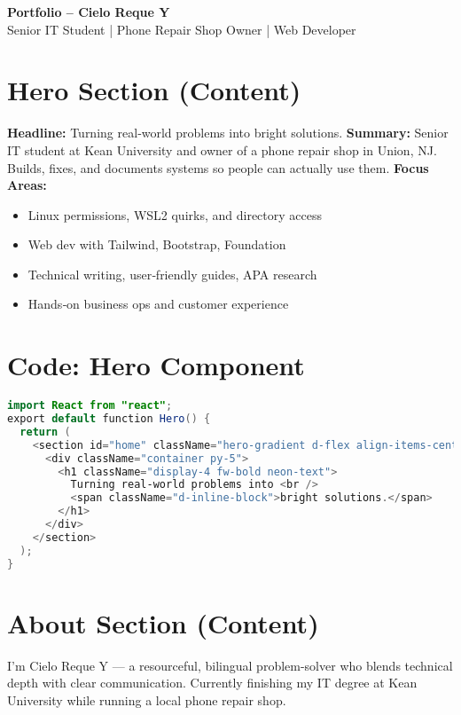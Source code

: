 \documentclass[11pt]{article}
\begin{document}
\begin{center}
    {\Huge \textbf{Portfolio – Cielo Reque Y}} \\
    \vspace{0.5em}
    Senior IT Student | Phone Repair Shop Owner | Web Developer
\end{center}

\section*{Hero Section (Content)}
\textbf{Headline:} Turning real‑world problems into bright solutions.  
\textbf{Summary:} Senior IT student at Kean University and owner of a phone repair shop in Union, NJ. Builds, fixes, and documents systems so people can actually use them.  
\textbf{Focus Areas:}
\begin{itemize}[leftmargin=*]
    \item Linux permissions, WSL2 quirks, and directory access
    \item Web dev with Tailwind, Bootstrap, Foundation
    \item Technical writing, user‑friendly guides, APA research
    \item Hands‑on business ops and customer experience
\end{itemize}

\section*{Code: Hero Component}
\begin{lstlisting}[language=Java]
import React from "react";
export default function Hero() {
  return (
    <section id="home" className="hero-gradient d-flex align-items-center">
      <div className="container py-5">
        <h1 className="display-4 fw-bold neon-text">
          Turning real‑world problems into <br />
          <span className="d-inline-block">bright solutions.</span>
        </h1>
      </div>
    </section>
  );
}
\end{lstlisting}

\section*{About Section (Content)}
I’m Cielo Reque Y — a resourceful, bilingual problem-solver who blends technical depth with clear communication.  
Currently finishing my IT degree at Kean University while running a local phone repair shop.  
\end{document}
